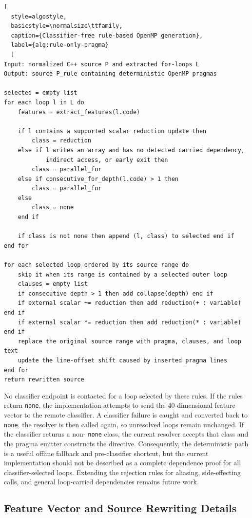 \begin{lstlisting}[
  style=algostyle,
  basicstyle=\normalsize\ttfamily,
  caption={Classifier-free rule-based OpenMP generation},
  label={alg:rule-only-pragma}
  ]
Input: normalized C++ source P and extracted for-loops L
Output: source P_rule containing deterministic OpenMP pragmas

selected = empty list
for each loop l in L do
    features = extract_features(l.code)

    if l contains a supported scalar reduction update then
        class = reduction
    else if l writes an array and has no detected carried dependency,
            indirect access, or early exit then
        class = parallel_for
    else if consecutive_for_depth(l.code) > 1 then
        class = parallel_for
    else
        class = none
    end if

    if class is not none then append (l, class) to selected end if
end for

for each selected loop ordered by its source range do
    skip it when its range is contained by a selected outer loop
    clauses = empty list
    if consecutive depth > 1 then add collapse(depth) end if
    if external scalar += reduction then add reduction(+ : variable) end if
    if external scalar *= reduction then add reduction(* : variable) end if
    replace the original source range with pragma, clauses, and loop text
    update the line-offset shift caused by inserted pragma lines
end for
return rewritten source
\end{lstlisting}

No classifier endpoint is contacted for a loop selected by these rules. If the
rules return \texttt{none}, the implementation attempts to send the
40-dimensional feature vector to the remote classifier. A classifier failure is
caught and converted back to \texttt{none}, the resolver is then called again,
so unresolved loops remain unchanged. If the classifier returns a non-
\texttt{none} class, the current resolver accepts that class and the pragma
emitter constructs the directive. Consequently, the deterministic path is a
useful offline fallback and pre-classifier shortcut, but the current
implementation should not be described as a complete dependence proof for all
classifier-selected loops. Extending the rejection rules for aliasing,
side-effecting calls, and general loop-carried dependencies remains future work.

\subsection{Feature Vector and Source Rewriting Details}

